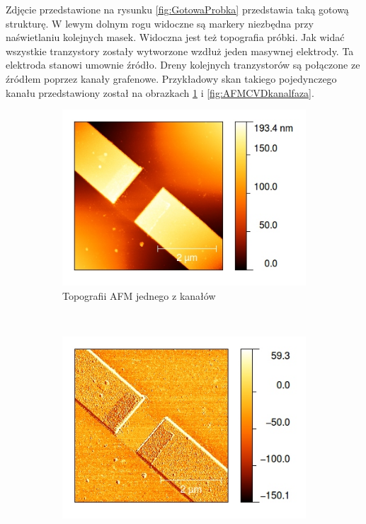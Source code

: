 Zdjęcie przedstawione na rysunku \ref{fig:GotowaProbka} przedstawia taką gotową strukturę. W lewym dolnym rogu
widoczne są markery niezbędna przy naświetlaniu kolejnych masek. Widoczna jest też topografia próbki. 
Jak widać wszystkie tranzystory zostały wytworzone wzdłuż jeden masywnej elektrody. Ta elektroda stanowi
umownie źródło. Dreny kolejnych tranzystorów są połączone ze źródłem poprzez kanały grafenowe. Przykładowy skan
takiego pojedynczego kanału przedstawiony został na obrazkach \ref{fig:AFMCVDkanal} i \ref{fig:AFMCVDkanalfaza}. 

\begin{figure}[ht]
        \centering
        \begin{subfigure}[b]{0.48\textwidth}
                \centering
                \includegraphics[width=\textwidth]{./Rozdzial_3/obrazki/20130521-g32}
                \caption{Topografii AFM jednego z kanałów}
                \label{fig:AFMCVDkanal}
        \end{subfigure}%
        ~ %
        \begin{subfigure}[b]{0.48\textwidth}
                \centering
                \includegraphics[width=\textwidth]{./Rozdzial_3/obrazki/20130521-g32faza}

\end{subfigure}
\end{figure}
